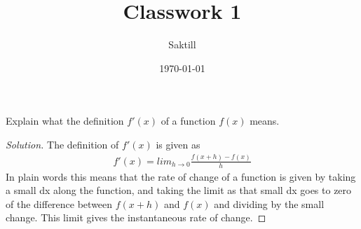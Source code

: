 \documentclass[aps,pra,notitlepage,amsmath,amssymb,letterpaper,12pt]{revtex4-1}
\newenvironment{problem}[2][Problem]{\begin{trivlist}
\item[\hskip \labelsep {\bfseries #1}\hskip \labelsep {\bfseries #2.}]}{\end{trivlist}}
\newenvironment{solution}{\begin{proof}[Solution]}{\end{proof}}
\begin{document}
 
\title{Classwork 1}
\author{Saktill}
\date{\today}

\maketitle

%
\begin{problem}{x.yz} 
Explain what the definition $f'(x)$ of a function $f(x)$ means.
\end{problem}
 
\begin{solution}
The definition of $f'(x)$ is given as
\[
\begin{split}
f'(x) =  lim_{h\to 0} \frac{f(x+h) - f(x)}{h}
\end{split}
\]
In plain words this means that the rate of change of a function is given by taking a small dx along the function, and taking the limit as that small dx goes to zero of the difference between $f(x+h)$ and $f(x)$ and dividing by the small change. This limit gives the instantaneous rate of change.




\end{solution}
\end{document}

